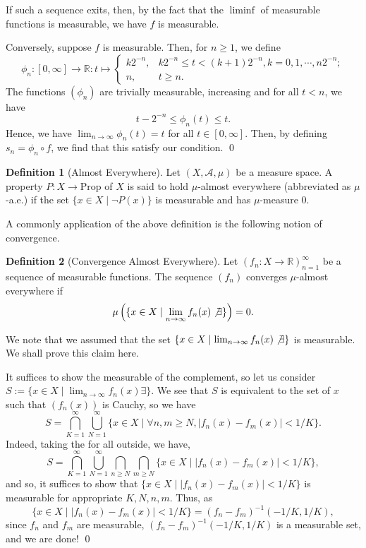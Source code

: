 \documentclass[
]{article}
\theoremstyle{definition}
\theoremstyle{definition}
\newtheorem{definition}{Definition}[section]
\begin{document}
If such a sequence exits, then, by the fact that the \(\liminf\) of
measurable functions is measurable, we have \(f\) is measurable.

Conversely, suppose \(f\) is measurable. Then, for \(n \ge 1\), we
define \[\phi_n : [0, \infty] \to \mathbb{R} : t \mapsto 
  \begin{cases}
    k2^{-n}, & k2^{-n} \le t < (k + 1)2^{-n}, k = 0, 1, \cdots, n2^{-n};\\
    n, & t \ge n.
  \end{cases}\] The functions \((\phi_n)\) are trivially measurable,
increasing and for all \(t < n\), we have
\[t - 2^{-n} \le \phi_n(t) \le t.\] Hence, we have
\(\lim_{n \to \infty} \phi_n(t) = t\) for all \(t \in [0, \infty]\).
Then, by defining \(s_n = \phi_n \circ f\), we find that this satisfy
our condition. \qed

\begin{definition}[Almost Everywhere]
  Let \((X, \mathcal{A}, \mu)\) be a measure space. A property \(P : X \to \text{Prop}\) 
  of \(X\) is said to hold \(\mu\)-almost everywhere (abbreviated as \(\mu\)-a.e.) if 
  the set \(\{x \in X \mid \neg P(x)\}\) is measurable and has \(\mu\)-measure 0.
\end{definition}

A commonly application of the above definition is the following notion
of convergence.

\begin{definition}[Convergence Almost Everywhere]
  Let \((f_n : X \to \mathbb{R})_{n = 1}^\infty\) be a sequence of measurable functions. 
  The sequence \((f_n)\) converges \(\mu\)-almost everywhere if 
  \[\mu\left(\{x \in X \mid \lim_{n \to \infty} f_n(x) \not\exists\}\right) = 0.\]
\end{definition}

We note that we assumed that the set
\(\{x \in X \mid \lim_{n \to \infty} f_n(x) \not\exists\}\) is
measurable. We shall prove this claim here.

\proof

It suffices to show the measurable of the complement, so let us consider
\(S := \{x \in X \mid \lim_{n \to \infty} f_n(x) \exists\}\). We see
that \(S\) is equivalent to the set of \(x\) such that \((f_n(x))\) is
Cauchy, so we have \[S = \bigcap_{K = 1}^\infty \bigcup_{N = 1}^\infty 
  \{x \in X \mid \forall n, m \ge N, |f_n(x) - f_m(x)| < 1 / K\}.\]
Indeed, taking the for all outside, we have,
\[S = \bigcap_{K = 1}^\infty \bigcup_{N = 1}^\infty 
  \bigcap_{n \ge N}\bigcap_{m \ge N}
  \{x \in X \mid |f_n(x) - f_m(x)| < 1 / K\},\] and so, it suffices to
show that \(\{x \in X \mid |f_n(x) - f_m(x)| < 1 / K\}\) is measurable
for appropriate \(K, N, n, m\). Thus, as
\[\{x \in X \mid |f_n(x) - f_m(x)| < 1 / K\} = (f_n - f_m)^{-1}(-1 / K, 1 / K),\]
since \(f_n\) and \(f_m\) are measurable,
\((f_n - f_m)^{-1}(-1 / K, 1 / K)\) is a measurable set, and we are
done! \qed
\end{document}
